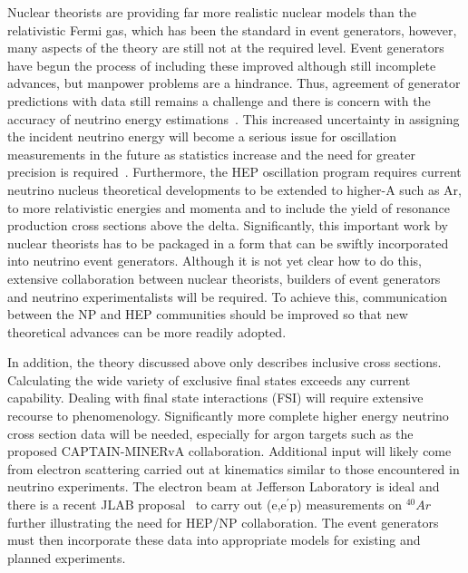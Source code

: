Nuclear theorists are providing far more realistic nuclear models than
the relativistic Fermi gas, which has been the standard in event
generators, however, many aspects of the theory are still not at the
required level.  Event generators have begun the process of including
these improved although still incomplete advances, but manpower
problems are a hindrance. Thus, agreement of generator predictions
with data still remains a challenge and there is concern with the
accuracy of neutrino energy
estimations~\cite{Martini:2011wp,Lalakulich:2012hs,Shneor:2007tu}.
This increased uncertainty in assigning the incident neutrino energy
will become a serious issue for oscillation measurements in the future
as statistics increase and the need for greater precision is
required~\cite{1412.4294}.  Furthermore, the HEP oscillation program
requires current neutrino nucleus theoretical developments to be
extended to higher-A such as Ar, to more relativistic energies and
momenta and to include the yield of resonance production cross
sections above the delta.  Significantly, this important work by
nuclear theorists has to be packaged in a form that can be swiftly
incorporated into neutrino event generators. Although it is not yet
clear how to do this, extensive collaboration between nuclear
theorists, builders of event generators and neutrino
experimentalists will be required. To achieve this, communication
between the NP and HEP communities should be improved so that new
theoretical advances can be more readily adopted.

In addition, the theory discussed above only describes inclusive cross
sections. Calculating the wide variety of exclusive final states
exceeds any current capability. Dealing with final state interactions
(FSI) will require extensive recourse to phenomenology.  Significantly
more complete higher energy neutrino cross section data will be
needed, especially for argon targets such as the proposed
CAPTAIN-MINERvA collaboration.  Additional input will likely come from
electron scattering carried out at kinematics similar to those
encountered in neutrino experiments. The electron beam at
Jefferson Laboratory is ideal and there is a recent JLAB
proposal~\cite{Benhar:2014nca} to carry out (e,e$^\prime$p) measurements on
$^{40}Ar$ further illustrating the need for HEP/NP collaboration.  The
event generators must then incorporate these data into appropriate
models for existing and planned experiments.
  


